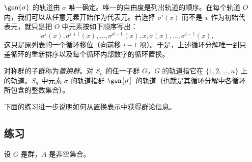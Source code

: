 $\gen{\sigma}$ 的轨道由 $\sigma$ 唯一确定。唯一的自由度是列出轨道的顺序。在每个轨道 $O$ 内，我们可以从任意元素开始作为代表元。若选择 $\sigma^i(x)$ 而不是 $x$ 作为初始代表元，就只是把 $O$ 中元素按如下顺序写出：
\[
  \sigma^i(x),\sigma^{i+1}(x),\ldots,\sigma^{d-1}(x),x,\sigma(x),\ldots,\sigma^{i-1}(x),
\]
这只是原列表的一个循环移位（向前移 $i-1$ 项）。于是，上述循环分解唯一到只差循环的重新排序以及每个循环内部数字的循环置换。

对称群的子群称为\emph{置换群}。对 $S_n$ 的任一子群 $G$，$G$ 的轨道指它在 $\{1,2,\ldots,n\}$ 上的轨道。$S_n$ 中元素 $\sigma$ 的轨道指群 $\gen{\sigma}$ 的轨道（也就是其循环分解中各循环所包含的整数集合）。

下面的练习进一步说明如何从置换表示中获得群论信息。

\subsection*{练习}
设 $G$ 是群，$A$ 是非空集合。
